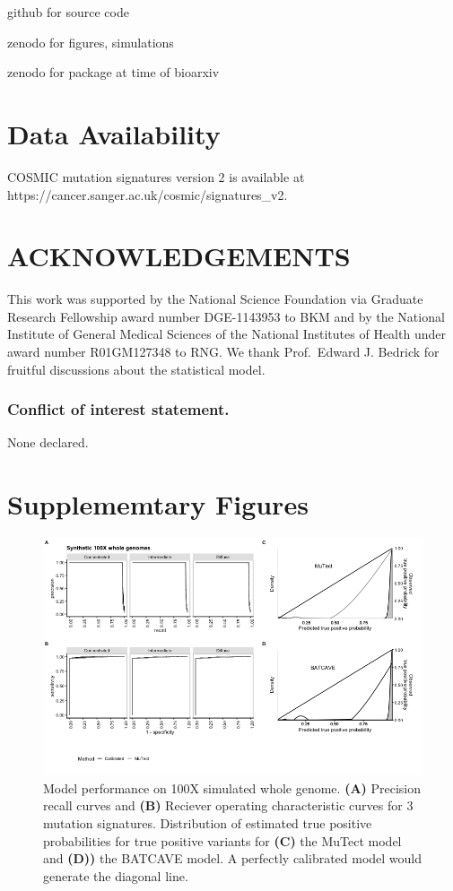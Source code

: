 \documentclass[a4,center,fleqn]{NAR}
\newcommand{\batcave}{BATCAVE }
\newcommand{\beginsupplement}{%
        \clearpage
        \onecolumn
        \setcounter{table}{0}
        \renewcommand{\thetable}{S\arabic{table}}%
        \setcounter{figure}{0}
        \renewcommand{\thefigure}{S\arabic{figure}}%
     }
\begin{document}
github for source code

zenodo for figures, simulations

zenodo for package at time of bioarxiv

\section{Data Availability}
COSMIC mutation signatures version 2 is available at \footnotesize{https://cancer.sanger.ac.uk/cosmic/signatures\_v2}.



\section{ACKNOWLEDGEMENTS}

This work was supported by the National Science Foundation via Graduate Research Fellowship award number DGE-1143953 to BKM and by the National Institute of General Medical Sciences of the National Institutes of Health under award number R01GM127348 to RNG.
We thank Prof.\ Edward J. Bedrick for fruitful discussions about the statistical model.

\subsubsection{Conflict of interest statement.} None declared.



\beginsupplement
\section{Supplememtary Figures}

\begin{figure}[b]
  \begin{center}
  \includegraphics[width=\textwidth]{figures/fig_wgs.png}
  \end{center}
  \caption{Model performance on 100X simulated whole genome.
  \textbf{(A)} Precision recall curves and \textbf{(B)} Reciever operating characteristic curves for 3 mutation signatures.
  Distribution of estimated true positive probabilities for true positive  variants for \textbf{(C)} the MuTect model and \textbf{(D))} the \batcave model.
  A perfectly calibrated model would generate the diagonal line.}
\label{NAR-wgs_fig}
\end{figure}
\end{document}

